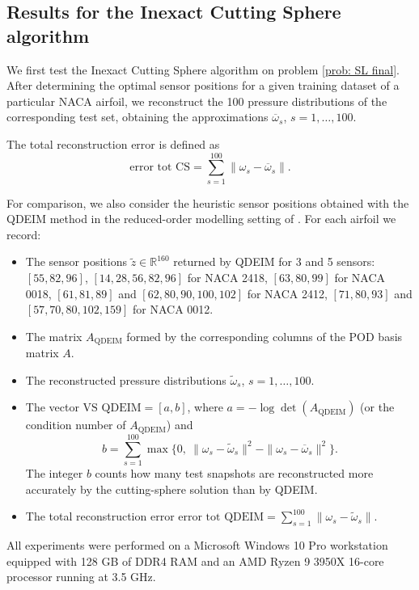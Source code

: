 \documentclass[12pt]{amsart}
\theoremstyle{plain}
\theoremstyle{definition}
\begin{document}
\subsection{Results for the Inexact Cutting Sphere algorithm}

We first test the Inexact Cutting Sphere algorithm \cite[Algorithm 3]{bednarczuk2026outer} on problem \eqref{prob: SL final}. After determining the optimal sensor positions for a given training dataset of a particular NACA airfoil, we reconstruct the 100 pressure distributions of the corresponding test set, obtaining the approximations \(\overline{\omega}_s\), \(s = 1, \dots, 100\).

The total reconstruction error is defined as
\[
\text{error tot CS} = \sum_{s=1}^{100} \|\omega_s - \overline{\omega}_s\|.
\]

For comparison, we also consider the heuristic sensor positions obtained with the QDEIM method in the reduced-order modelling setting of \cite{manohar2017data}. For each airfoil we record:
\begin{itemize}
    \item The sensor positions \(\tilde{z} \in \mathbb{R}^{160}\) returned by QDEIM for 3 and 5 sensors: $[55, 82, 96]$, $[14, 28, 56, 82, 96]$ for NACA 2418, $[63, 80, 99]$ for NACA 0018, $[61, 81, 89]$ and $[ 62 , 80 , 90, 100, 102]$ for NACA 2412, $[71, 80, 93]$ and $[ 57,  70,  80, 102, 159]$ for NACA 0012.
    \item The matrix \(A_{\text{QDEIM}}\) formed by the corresponding columns of the POD basis matrix \(A\).
    \item The reconstructed pressure distributions \(\tilde{\omega}_s\), \(s = 1, \dots, 100\).
    \item The vector \(\text{VS QDEIM} = [a, b]\), where \(a = -\log\det(A_{\text{QDEIM}})\) (or the condition number of \(A_{\text{QDEIM}}\)) and
    \[
    b = \sum_{s=1}^{100} \max\bigl\{0,\ \|\omega_s - \tilde{\omega}_s\|^2 - \|\omega_s - \overline{\omega}_s\|^2\bigr\}.
    \]
    The integer \(b\) counts how many test snapshots are reconstructed more accurately by the cutting-sphere solution than by QDEIM.
    \item The total reconstruction error \(\text{error tot QDEIM} = \sum_{s=1}^{100} \|\omega_s - \tilde{\omega}_s\|\).
\end{itemize}

All experiments were performed on a Microsoft Windows 10 Pro workstation equipped with 128 GB of DDR4 RAM and an AMD Ryzen 9 3950X 16-core processor running at 3.5 GHz.
\end{document}
